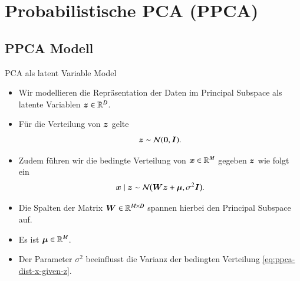 \section{Probabilistische PCA (PPCA)}

\divider

\subsection{PPCA Modell}

\begin{frame}{PCA als latent Variable Model}{}
	\begin{itemize}
		\item Wir modellieren die Repräsentation der Daten im Principal Subspace als latente Variablen $\bm{z} \in \mathbb{R}^D$.
		\item Für die Verteilung von $\bm{z}$ gelte
		\begin{equation} \label{eq:ppca-dist-z}
			\bm{z} \sim \mathcal{N}(\bm{0}, \bm{I}).
		\end{equation}
		\item Zudem führen wir die bedingte Verteilung von $\bm{x} \in \mathbb{R}^M$ gegeben $\bm{z}$ wie folgt ein
		\begin{equation} \label{eq:ppca-dist-x-given-z}
			\bm{x} \mid \bm{z} \sim \mathcal{N}\bigl( \bm{W} \bm{z} + \bm{\mu}, \sigma^2 \bm{I} \bigr).
		\end{equation}
		\item Die Spalten der Matrix $\bm{W} \in \mathbb{R}^{M \times D}$ spannen hierbei den Principal Subspace auf.
		\item Es ist $\bm{\mu} \in \mathbb{R}^M$.
		\item Der Parameter $\sigma^2$ beeinflusst die Varianz der bedingten Verteilung \eqref{eq:ppca-dist-x-given-z}.
	\end{itemize}
\end{frame}


